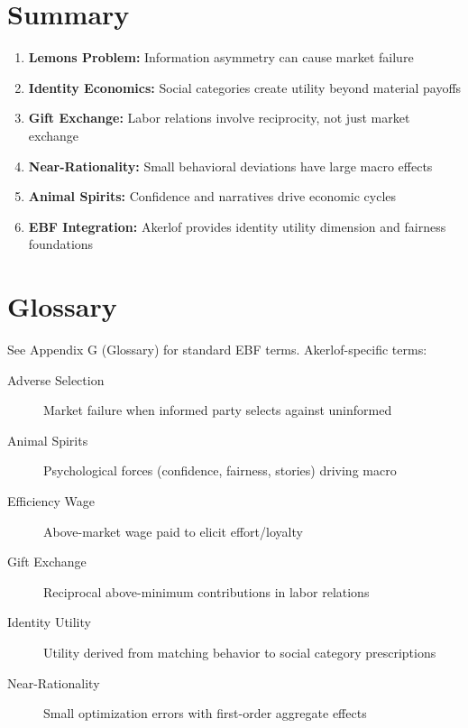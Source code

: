 \section{Summary}

\begin{tcolorbox}[colback=gray!10!white, colframe=gray!75!black, title=Key Takeaways]
\begin{enumerate}
    \item \textbf{Lemons Problem:} Information asymmetry can cause market failure
    \item \textbf{Identity Economics:} Social categories create utility beyond material payoffs
    \item \textbf{Gift Exchange:} Labor relations involve reciprocity, not just market exchange
    \item \textbf{Near-Rationality:} Small behavioral deviations have large macro effects
    \item \textbf{Animal Spirits:} Confidence and narratives drive economic cycles
    \item \textbf{EBF Integration:} Akerlof provides identity utility dimension and fairness foundations
\end{enumerate}
\end{tcolorbox}

\section{Glossary}

See Appendix G (Glossary) for standard EBF terms. Akerlof-specific terms:

\begin{description}
    \item[Adverse Selection] Market failure when informed party selects against uninformed
    \item[Animal Spirits] Psychological forces (confidence, fairness, stories) driving macro
    \item[Efficiency Wage] Above-market wage paid to elicit effort/loyalty
    \item[Gift Exchange] Reciprocal above-minimum contributions in labor relations
    \item[Identity Utility] Utility derived from matching behavior to social category prescriptions
    \item[Near-Rationality] Small optimization errors with first-order aggregate effects
\end{description}

